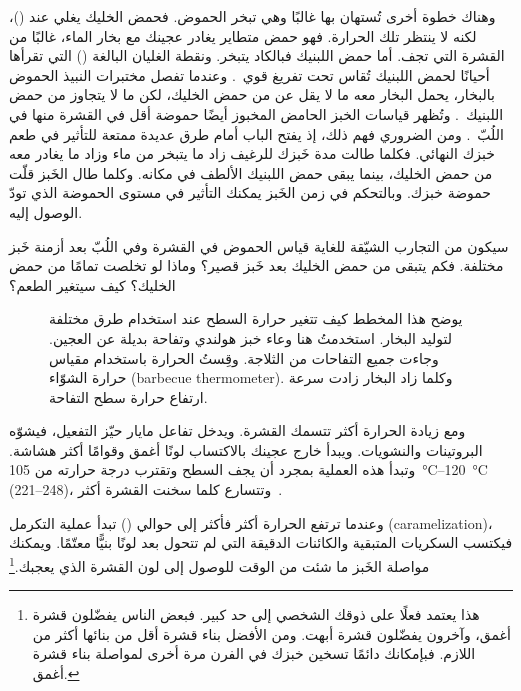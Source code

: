 وهناك خطوة أخرى تُستهان بها غالبًا وهي تبخر الحموض. فحمض الخليك يغلي عند  ()، لكنه لا ينتظر تلك الحرارة. فهو حمض متطاير يغادر عجينك مع بخار الماء، غالبًا من القشرة التي تجف. أما حمض اللبنيك فبالكاد يتبخر. ونقطة الغليان البالغة  () التي تقرأها أحيانًا لحمض اللبنيك تُقاس تحت تفريغ قوي~\cite{pubchem+lactic+acid}. وعندما تفصل مختبرات النبيذ الحموض بالبخار، يحمل البخار معه ما لا يقل عن  من حمض الخليك، لكن ما لا يتجاوز  من حمض اللبنيك~\cite{oiv+volatile+acidity}. وتُظهر قياسات الخبز الحامض المخبوز أيضًا حموضة أقل في القشرة منها في اللُبّ~\cite{vriesekoop+spent+grain}. ومن الضروري فهم ذلك، إذ يفتح الباب أمام طرق عديدة ممتعة للتأثير في طعم خبزك النهائي. فكلما طالت مدة خَبزك للرغيف زاد ما يتبخر من ماء وزاد ما يغادر معه من حمض الخليك، بينما يبقى حمض اللبنيك الألطف في مكانه. وكلما طال الخَبز قلّت حموضة خبزك. وبالتحكم في زمن الخَبز يمكنك التأثير في مستوى الحموضة الذي تودّ الوصول إليه.

سيكون من التجارب الشيّقة للغاية قياس الحموض في القشرة وفي اللُبّ بعد أزمنة خَبز مختلفة. فكم يتبقى من حمض الخليك بعد خَبز قصير؟ وماذا لو تخلصت تمامًا من حمض الخليك؟ كيف سيتغير الطعم؟

\begin{figure}[!htb]
  
  \caption[حرارة السطح لطرق توليد البخار المختلفة]{يوضح هذا المخطط كيف تتغير حرارة السطح عند استخدام طرق مختلفة لتوليد البخار. استخدمتُ هنا وعاء خبز هولندي وتفاحة بديلة عن العجين. وجاءت جميع التفاحات من الثلاجة. وقِستُ الحرارة باستخدام مقياس حرارة الشوّاء \textenglish{(barbecue thermometer)}. وكلما زاد البخار زادت سرعة ارتفاع حرارة سطح التفاحة.}
\end{figure}

ومع زيادة الحرارة أكثر تتسمك القشرة. ويدخل تفاعل مايار حيّز التفعيل، فيشوّه البروتينات والنشويات. ويبدأ خارج عجينك بالاكتساب لونًا أغمق وقوامًا أكثر هشاشة. وتبدأ هذه العملية بمجرد أن يجف السطح وتقترب درجة حرارته من \qtyrange{105}{120}{\degreeCelsius} (\qtyrange{221}{248}{\degF})، وتتسارع كلما سخنت القشرة أكثر~\cite{purlis+browning}.

وعندما ترتفع الحرارة أكثر فأكثر إلى حوالي  () تبدأ عملية التكرمل \textenglish{(caramelization)}، فيكتسب السكريات المتبقية والكائنات الدقيقة التي لم تتحول بعد لونًا بنيًّا معتّمًا. ويمكنك مواصلة الخَبز ما شئت من الوقت للوصول إلى لون القشرة الذي يعجبك.\footnote{هذا يعتمد فعلًا على ذوقك الشخصي إلى حد كبير. فبعض الناس يفضّلون قشرة أغمق، وآخرون يفضّلون قشرة أبهت. ومن الأفضل بناء قشرة أقل من بنائها أكثر من اللازم. فبإمكانك دائمًا تسخين خبزك في الفرن مرة أخرى لمواصلة بناء قشرة أغمق.}

